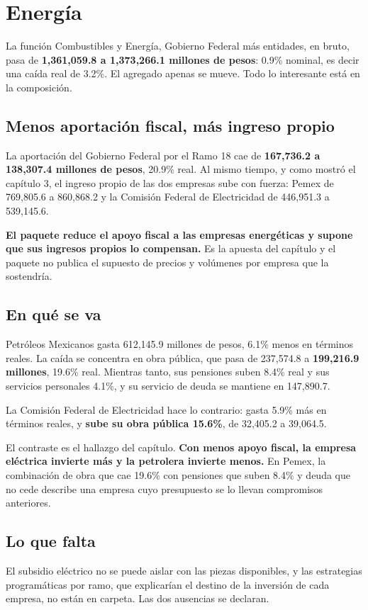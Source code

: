 \chapter{Energía}

La función Combustibles y Energía, Gobierno Federal más entidades, en bruto, pasa
de \textbf{1,361,059.8 a 1,373,266.1 millones de pesos}: 0.9\% nominal, es decir
una caída real de 3.2\%. El agregado apenas se mueve. Todo lo interesante está en
la composición.



\section{Menos aportación fiscal, más ingreso propio}

La aportación del Gobierno Federal por el Ramo 18 cae de \textbf{167,736.2 a
138,307.4 millones de pesos}, 20.9\% real. Al mismo tiempo, y como mostró el
capítulo 3, el ingreso propio de las dos empresas sube con fuerza: Pemex de
769,805.6 a 860,868.2 y la Comisión Federal de Electricidad de 446,951.3 a
539,145.6.

\textbf{El paquete reduce el apoyo fiscal a las empresas energéticas y supone que
sus ingresos propios lo compensan.} Es la apuesta del capítulo y el paquete no
publica el supuesto de precios y volúmenes por empresa que la sostendría.



\section{En qué se va}

Petróleos Mexicanos gasta 612,145.9 millones de pesos, 6.1\% menos en términos
reales. La caída se concentra en obra pública, que pasa de 237,574.8 a
\textbf{199,216.9 millones}, 19.6\% real. Mientras tanto, sus pensiones suben
8.4\% real y sus servicios personales 4.1\%, y su servicio de deuda se mantiene en
147,890.7.

La Comisión Federal de Electricidad hace lo contrario: gasta 5.9\% más en términos
reales, y \textbf{sube su obra pública 15.6\%}, de 32,405.2 a 39,064.5.

El contraste es el hallazgo del capítulo. \textbf{Con menos apoyo fiscal, la
empresa eléctrica invierte más y la petrolera invierte menos.} En Pemex, la
combinación de obra que cae 19.6\% con pensiones que suben 8.4\% y deuda que no
cede describe una empresa cuyo presupuesto se lo llevan compromisos anteriores.

\section{Lo que falta}

El subsidio eléctrico no se puede aislar con las piezas disponibles, y las
estrategias programáticas por ramo, que explicarían el destino de la inversión de
cada empresa, no están en carpeta. Las dos ausencias se declaran.

\clearpage
